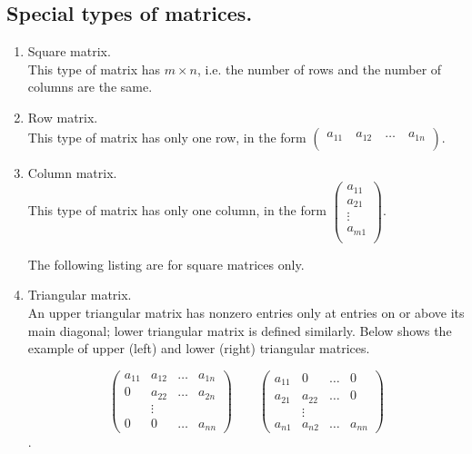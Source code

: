 \documentclass[11pt,a4paper]{article}
\begin{document}
\subsection {Special types of matrices.}
\begin{enumerate}
\item Square matrix.\\
This type of matrix has $m\times n$, i.e. the number of rows and the number of columns are the same.

\item Row matrix.\\
This type of matrix has only one row, in the form  $\left( \begin{array}{c}
a_{11} \quad a_{12} \quad \ldots \quad a_{1n}\\
\end{array} \right)$.

\item Column matrix.\\
This type of matrix has only one column, in the form  $\left( \begin{array}{cccc}
a_{11}\\
a_{21}\\
\vdots\\
a_{m1}\\
\end{array} \right)$.

The following listing are for square matrices only.

\item Triangular matrix.\\
An upper triangular matrix has nonzero entries only at entries on or above its main diagonal; lower triangular matrix is defined similarly. Below shows the example of upper (left) and lower (right) triangular matrices.

$$\left(\begin{array}{cccc}
a_{11} & a_{12} & \ldots & a_{1n}\\
0 & a_{22} & \ldots & a_{2n}\\
&\vdots\\
0 & 0 & \ldots & a_{nn}\end{array}\right)\qquad
\left(\begin{array}{cccc}
a_{11} & 0 & \ldots & 0\\
a_{21} & a_{22} & \ldots & 0\\
&\vdots\\
a_{n1} & a_{n2} & \ldots & a_{nn}\end{array}\right)$$.


\end{enumerate}
\end{document}
